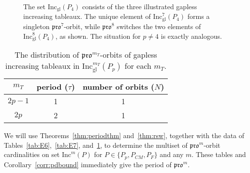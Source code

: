 \documentclass[12pt]{amsart}
\theoremstyle{definition}
\theoremstyle{remark}
\numberwithin{equation}{section}
\newcommand{\inc}{\ensuremath{\mathrm{Inc}}}
\newcommand{\incgl}{\inc_{\mathrm{gl}}}
\newcommand{\pro}{\mathfrak{pro}}
\begin{document}
\begin{figure}[h]
\caption{The set $\incgl(P_4)$ consists of the three illustrated gapless increasing tableaux. The unique element of $\incgl^7(P_4)$ forms a singleton $\pro^7$-orbit, while $\pro^8$ switches the two elements of $\incgl^8(P_4)$, as shown. The situation for $p \neq 4$ is exactly analogous.}\label{fig:propeller_orbits}
\end{figure}

\begin{table}[h]
\begin{tabular}{|c|c|c|}
\hline
$m_T$ & period ($\tau$) & number of orbits ($N$)\\
  \hline
  $2p-1$ & 1 & 1\\
  \hline
  $2p$ & 2 & 1\\ 
  \hline
\end{tabular}
\caption{The distribution of $\pro^{m_T}$-orbits of gapless increasing tableaux in $\incgl^{m_T}(P_p)$ for each ${m_T}$.}
\label{tab:prop}
\end{table}

 
We will use Theorems~\ref{thm:periodthm} and~\ref{thm:rsw}, together with the data of Tables~\ref{tab:E6},~\ref{tab:E7}, and~\ref{tab:prop}, to determine the multiset of $\pro^m$-orbit cardinalities on set $\inc^m(P)$ for $P \in \{P_p, P_{CM}, P_F \}$ and any $m$. These tables and Corollary~\ref{corr:pdbound} immediately give the period of $\pro^m$.
\end{document}
